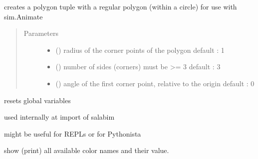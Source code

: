 \documentclass[letterpaper,10pt,english]{sphinxmanual}
\begin{document}
\begin{fulllineitems}
\label{\detokenize{Reference:salabim.regular_polygon}}
creates a polygon tuple with a regular polygon (within a circle) for use with sim.Animate
\begin{quote}\begin{description}
\item[{Parameters}] \leavevmode\begin{itemize}
\item {} 
 () \textendash{} radius of the corner points of the polygon 
default : 1

\item {} 
 () \textendash{} number of sides (corners) 
must be \textgreater{}= 3 
default : 3

\item {} 
 () \textendash{} angle of the first corner point, relative to the origin 
default : 0

\end{itemize}

\end{description}\end{quote}

\end{fulllineitems}


\begin{fulllineitems}
\label{\detokenize{Reference:salabim.reset}}
resets global variables

used internally at import of salabim

might be useful for REPLs or for Pythonista

\end{fulllineitems}


\begin{fulllineitems}
\label{\detokenize{Reference:salabim.show_colornames}}
show (print) all available color names and their value.

\end{fulllineitems}
\end{document}
